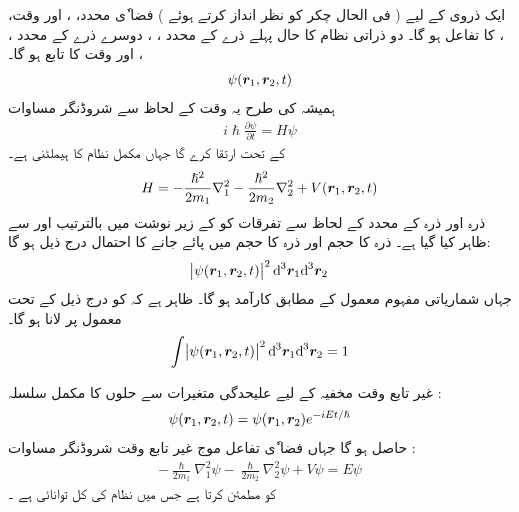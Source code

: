 ایک ذروی کے لیے ( فی الحال چکر کو نظر انداز کرتے ہوئے )       فضا ٗی محدد، ،  اور وقت،  ،  کا تفاعل ہو گا۔ دو ذراتی نظام کا حال پہلے ذرے کے محدد ، ،  دوسرے ذرے کے محدد ، ،  اور وقت کا تابع ہو گا۔ 
\begin{align}   
\psi ( {{\boldsymbol{r}}}_1 , {{\boldsymbol{r}}}_2 , t ) 
\end{align}
 ہمیشہ کی طرح یہ وقت کے لحاظ سے شروڈنگر مساوات 
\begin{align}
i \hslash \frac{ \partial \psi }{ \partial t } = H \psi
\end{align}
کے تحت ارتقا کرے گا جہاں  مکمل  نظام کا ہیملٹنی  ہے۔
\begin{equation}
H = - \frac{ \hslash^2 }{ 2 m_1 } \nabla_1^2  -  \frac{ \hslash^2 }{ 2 m_2 }  \nabla_2^2 +  V({{\boldsymbol{r}}}_1 , {{\boldsymbol{r}}}_2 , t )
\end{equation}
ذرہ    اور  ذرہ     کے محدد کے لحاظ سے  تفرقات  کو   کے  زیر نوشت میں بالترتیب    اور      سے ظاہر کیا گیا ہے۔ ذرہ    کا
 حجم   اور ذرہ    کا حجم  میں  پائے جانے کا احتمال درج ذیل ہو گا:
\begin{align}
\abs{\psi (\kvec{r}_1 , \kvec{r}_2 , t ) }^2  {\dif^{\,3} } { \kvec{r}_1 }  {\dif^{\,3} } { \kvec{r}_2 }
\end{align}
جہاں شماریاتی مفہوم   معمول کے مطابق کارآمد ہو گا۔ ظاہر ہے کہ   کو درج ذیل کے تحت  معمول پر لانا ہو گا۔ 
\begin{align}
\int \abs{\psi ( \kvec{r}_1 , \kvec{r}_2 , t ) }^2 {\dif^{\,3} } {\kvec{r}_1 } {\dif^{\,3} } { \kvec{r}_2 } = 1
\end{align}

غیر تابع وقت مخفیہ کے لیے علیحدگی  متغیرات  سے حلوں کا   مکمل سلسلہ :
\begin{align}
\psi ( {{\boldsymbol{r}}}_1 , {{\boldsymbol{r}}}_2 , t ) =  \psi ( {{\boldsymbol{r}}}_1 , {{\boldsymbol{r}}}_2 ) {e}^{-i E t/\hslash}  
\end{align}
حاصل ہو گا جہاں فضا ٗی تفاعل موج   غیر تابع وقت شروڈنگر مساوات :
\begin{align}
-\frac{ \hslash }{ 2 m_1 }  {\nabla_1^2} { \psi } - \frac{ \hslash }{ 2 m_2 } \nabla_2^2 { \psi } + V \psi =E\psi
\end{align}
کو مطمئن کرتا ہے جس میں    نظام کی کل توانائی ہے ۔ 


